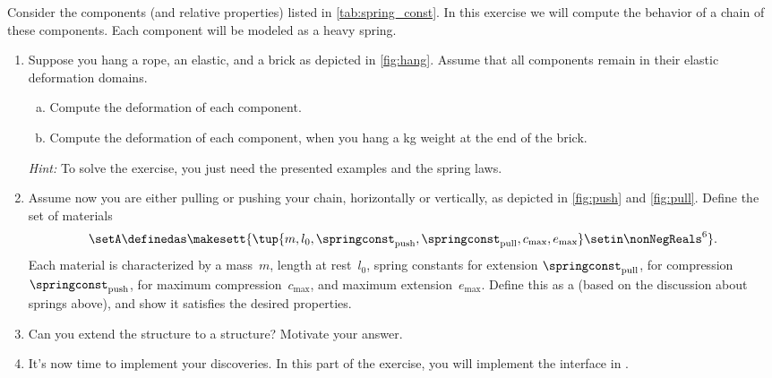 \begin{gradedexercise}
    \label{ex:Goldberg}
    Consider the components (and relative properties) listed in \cref{tab:spring_const}.
    In this exercise we will compute the behavior of a ch{}ain of these components.
    Each component will be modeled as a heavy spring.
    \begin{enumerate}
        \item Suppose you hang a rope, an elastic, and a brick as depicted in \cref{fig:hang}.
              Assume that all components remain in their elastic deformation domains.
              \begin{enumerate}[(a)]
                  \item Compute the deformation of each component.
                  \item Compute the deformation of each component, when you hang a \unit[1]{kg} weight at the end of the brick.
              \end{enumerate}
              \emph{Hint:}
              To solve the exercise, you just need the presented examples and the spring laws.
        \item Assume now you are either pulling or pushing your cha{}in, horizontally or vertically, as depicted in \cref{fig:push} and \cref{fig:pull}.
              Define the set of materials
              \begin{equation}
                  \setA\definedas \makesett{ \tup{m,l_0, \springconst_\mathrm{push},\springconst_\mathrm{pull}, c_\mathrm{max}, e_\mathrm{max}} \setin \nonNegReals^6}.
              \end{equation}
              Each material is characterized by a mass~$m$, length at rest~$l_0$, spring constants for extension $\springconst_\mathrm{pull}$, for compression~$\springconst_\mathrm{push}$, for maximum compression~$c_\mathrm{max}$, and maximum extension~$e_\mathrm{max}$.
              Define this as a  (based on the discussion about springs above), and show it satisfies the desired properties.
        \item Can you extend the  structure to a  structure?
              Motivate your answer.
        \item It's now time to implement your discoveries.
              In this part of the exercise, you will implement the interface in .


\end{enumerate}
\end{gradedexercise}
